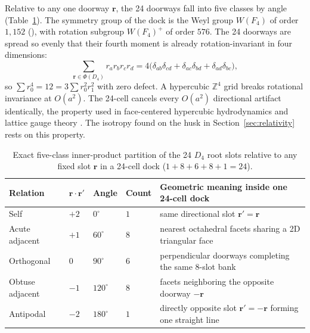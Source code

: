 Relative to any one doorway $\mathbf{r}$, the 24 doorways fall into five classes by angle (Table~\ref{tab:d4-nbrs}). The symmetry group of the dock is the Weyl group $W(F_4)$ of order $1{,}152$
(), with rotation subgroup $W(F_4)^+$ of order $576$. The 24 doorways are spread so evenly that their
fourth moment is already rotation-invariant in four dimensions:
\begin{equation}
\sum_{\mathbf{r} \in \Phi(D_4)} r_a r_b r_c r_d
= 4\bigl(\delta_{ab}\delta_{cd} + \delta_{ac}\delta_{bd} + \delta_{ad}\delta_{bc}\bigr),
\label{eq:d4-isotropy}
\end{equation}
so $\sum r_0^4 = 12 = 3 \sum r_0^2 r_1^2$ with zero defect. A hypercubic $\mathbb{Z}^4$ grid breaks rotational
invariance at $O(a^2)$. The 24-cell cancels every $O(a^2)$ directional artifact identically, the property used in
face-centered hypercubic hydrodynamics \cite{frisch1987fchc} and lattice gauge theory \cite{celmaster1982}. The
isotropy found on the husk in Section~\ref{sec:relativity} rests on this property.

\begin{table}[htbp]
\centering
\caption{Exact five-class inner-product partition of the 24 $D_4$ root slots relative to any fixed slot $\mathbf{r}$ in
a 24-cell dock ($1 + 8 + 6 + 8 + 1 = 24$).}
\label{tab:d4-nbrs}
\small
\begin{tabularx}{\textwidth}{@{}>{\raggedright\arraybackslash}p{2.75cm}>{\raggedright\arraybackslash}p{1.4cm}>{\raggedright\arraybackslash}p{1.3cm}>{\raggedright\arraybackslash}p{1.2cm}>{\raggedright\arraybackslash}X@{}}
\toprule
Relation & $\mathbf{r} \cdot \mathbf{r}'$ & Angle & Count & Geometric meaning inside one 24-cell dock \\
\midrule
Self & $+2$ & $0^\circ$ & $1$ & same directional slot $\mathbf{r}' = \mathbf{r}$ \\
Acute adjacent & $+1$ & $60^\circ$ & $8$ & nearest octahedral facets sharing a 2D triangular face \\
Orthogonal & $0$ & $90^\circ$ & $6$ & perpendicular doorways completing the same 8-slot bank \\
Obtuse adjacent & $-1$ & $120^\circ$ & $8$ & facets neighboring the opposite doorway $-\mathbf{r}$ \\
Antipodal & $-2$ & $180^\circ$ & $1$ & directly opposite slot $\mathbf{r}' = -\mathbf{r}$ forming one straight line \\
\bottomrule
\end{tabularx}
\end{table}


